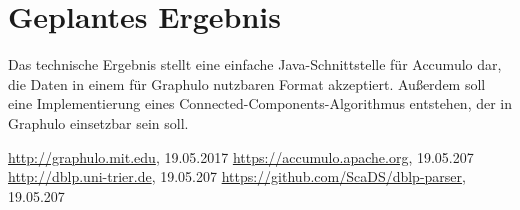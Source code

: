 \documentclass{article}
\begin{document}
\section{Geplantes Ergebnis}


Das technische Ergebnis stellt eine einfache Java-Schnittstelle für Accumulo dar, die Daten in einem für Graphulo nutzbaren Format akzeptiert. Außerdem soll eine Implementierung eines Connected-Components-Algorithmus entstehen, der in Graphulo einsetzbar sein soll.



\begin{thebibliography}{laengste Labelbreite}
	 \url{http://graphulo.mit.edu}, 19.05.2017
	 \url{https://accumulo.apache.org}, 19.05.207
	 \url{http://dblp.uni-trier.de}, 19.05.207
	 \url{https://github.com/ScaDS/dblp-parser}, 19.05.207
\end{thebibliography}
\end{document}
